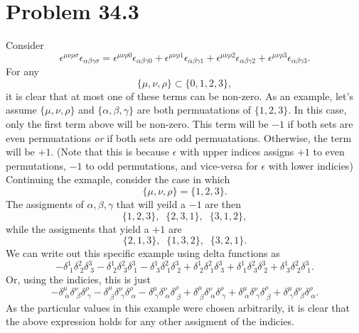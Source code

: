 \documentclass[12pt]{article}
\begin{document}
\section*{Problem 34.3}
Consider
\[ \epsilon^{\mu\nu\rho\sigma}\epsilon_{\alpha\beta\gamma\sigma} = \epsilon^{\mu\nu\rho 0}\epsilon_{\alpha\beta\gamma 0} + \epsilon^{\mu\nu\rho 1}\epsilon_{\alpha\beta\gamma 1} + \epsilon^{\mu\nu\rho 2}\epsilon_{\alpha\beta\gamma 2} + \epsilon^{\mu\nu\rho 3}\epsilon_{\alpha\beta\gamma 3}. \]
For any 
\[ \{\mu, \nu, \rho\} \subset \{0, 1, 2, 3\}, \]
it is clear that at most one of these terms can be non-zero. As an example, let's assume $\{\mu, \nu, \rho\}$ and $\{\alpha, \beta, \gamma\}$ are both permuatations of $\{1, 2, 3\}$. In this case, only the first term above will be non-zero. This term will be $-1$ if both sets are even permuatations \textit{or} if both sets are odd permuatations. Otherwise, the term will be $+1$. (Note that this is because $\epsilon$ with upper indices assigns $+1$ to even permutations, $-1$ to odd permutations, and vice-versa for $\epsilon$ with lower indicies) Continuing the exmaple, consider the case in which 
\[ \{\mu, \nu, \rho\} = \{1, 2, 3\}. \]
The assigments of ${\alpha, \beta, \gamma}$ that will yeild a $-1$ are then
\[ \{1,2,3\}, \;\; \{2,3,1\}, \;\; \{3,1,2\}, \]
while the assigments that yield a $+1$ are
\[ \{2,1,3\}, \;\; \{1,3,2\}, \;\; \{3,2,1\}. \]
We can write out this specific example using delta functions as
\[ -\delta_{\;1}^{1}\delta_{\;2}^{2}\delta_{\;3}^{3} - \delta_{\;2}^{1}\delta_{\;3}^{2}\delta_{\;1}^{3} - \delta_{\;3}^{1}\delta_{\;1}^{2}\delta_{\;2}^{3} + \delta_{\;2}^{1}\delta_{\;1}^{2}\delta_{\;3}^{3} + \delta_{\;1}^{1}\delta_{\;3}^{2}\delta_{\;2}^{3} + \delta_{\;3}^{1}\delta_{\;2}^{2}\delta_{\;1}^{3}. \]
Or, using the indicies, this is just
\[ -\delta_{\;\alpha}^{\mu}\delta_{\;\beta}^{\nu}\delta_{\;\gamma}^{\rho} - \delta_{\;\beta}^{\mu}\delta_{\;\gamma}^{\nu}\delta_{\;\alpha}^{\rho} - \delta_{\;\gamma}^{\mu}\delta_{\;\alpha}^{\nu}\delta_{\;\beta}^{\rho} + \delta_{\;\beta}^{\mu}\delta_{\;\alpha}^{\nu}\delta_{\;\gamma}^{\rho} + \delta_{\;\alpha}^{\mu}\delta_{\;\gamma}^{\nu}\delta_{\;\beta}^{\rho} + \delta_{\;\gamma}^{\mu}\delta_{\;\beta}^{\nu}\delta_{\;\alpha}^{\rho}. \]
As the particular values in this example were chosen arbitrarily, it is clear that the above expression holds for any other assigment of the indicies. \\
\end{document}
